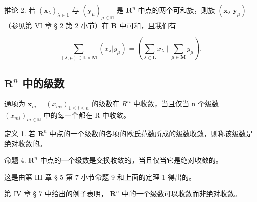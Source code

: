 推论 2. 若 \((\pmb{x}_{\lambda})_{\lambda \in \mathbb{L}}\) 与 \((\pmb{y}_{\mu})_{\mu \in \mathbb{M}}\) 是 \(\mathbf{R}^n\) 中点的两个可和族，则族 \((\pmb{x}_{\lambda}|\pmb{y}_{\mu})\) （参见第 VI 章 § 2 第 2 小节）在 \(\mathbf{R}\) 中可和，且我们有

\[
\sum_ {(\lambda , \mu) \in \mathbf {L} \times \mathbf {M}} (x _ {\lambda} | y _ {\mu}) = \left(\sum_ {\lambda \in \mathbf {L}} x _ {\lambda} \mid \sum_ {\mu \in \mathbf {M}} y _ {\mu}\right).\tag{5}
\]

\subsection{\texorpdfstring{\(\mathbf{R}^n\) 中的级数}{R 的 n 次幂中的级数}}

通项为 \(\boldsymbol{x}_{m} = (x_{mi})_{1 \leqslant i \leqslant n}\) 的级数在 \(R^{n}\) 中收敛，当且仅当 n 个级数 \((x_{mi})_{m \in \mathbb{N}}\) 中的每一个都在 R 中收敛。

定义 1. 若 \(\mathbf{R}^n\) 中点的一个级数的各项的欧氏范数所成的级数收敛，则称该级数是绝对收敛的。

命题 4. \(\mathbf{R}^n\) 中点的一个级数是交换收敛的，当且仅当它是绝对收敛的。

这是由第 III 章 § 5 第 7 小节命题 9 和上面的定理 1 得出的。

第 IV 章 § 7 中给出的例子表明， \(\mathbf{R}^n\) 中的一个级数可以收敛而非绝对收敛。
